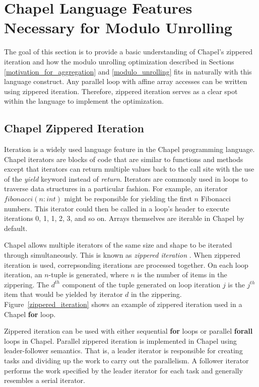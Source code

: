 \section{Chapel Language Features Necessary for Modulo Unrolling}\label{sec:language_features}

The goal of this section is to provide a basic understanding of Chapel's zippered iteration and how the modulo unrolling optimization described in Sections \ref{motivation_for_aggregation} and \ref{modulo_unrolling} fits in naturally with this language construct. Any parallel loop with affine array accesses can be written using zippered iteration. Therefore, zippered iteration serves as a clear spot within the language to implement the optimization.

\subsection{Chapel Zippered Iteration}\label{sec:zippered_iteration}

Iteration is a widely used language feature in the Chapel programming language. Chapel iterators are blocks of code that are similar to functions and methods except that iterators can return multiple values back to the call site with the use of the \textit{yield} keyword instead of \textit{return}. Iterators are commonly used in loops to traverse data structures in a particular fashion. For example, an iterator $fibonacci(n: int)$ might be responsible for yielding the first $n$ Fibonacci numbers. This iterator could then be called in a loop's header to execute iterations 0, 1, 1, 2, 3, and so on.  Arrays themselves are iterable in Chapel by default. 

Chapel allows multiple iterators of the same size and shape to be iterated through simultaneously. This is known as \textit{zippered iteration} \cite{chamberlain2011user}. When zippered iteration is used, correpsonding iterations are processed together. On each loop iteration, an $n$-tuple is generated, where $n$ is the number of items in the zippering. The $d^{th}$ component of the tuple generated on loop iteration $j$ is the $j^{th}$ item that would be yielded by iterator $d$ in the zippering. Figure~\ref{zippered_iteration} shows an example of zippered iteration used in a Chapel \textbf{for} loop. 

Zippered iteration can be used with either sequential \textbf{for} loops or parallel \textbf{forall} loops in Chapel. Parallel zippered iteration is implemented in Chapel using leader-follower semantics. That is, a leader iterator is responsible for creating tasks and dividing up the work to carry out the parallelism. A follower iterator performs the work specified by the leader iterator for each task and generally resembles a  serial iterator. 

